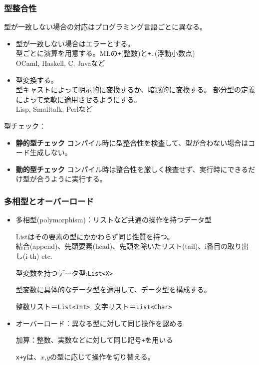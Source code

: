 \documentclass[dvipdfmx]{beamer}
\begin{document}
\begin{frame}
  \frametitle{型整合性}
  型が一致しない場合の対応はプログラミング言語ごとに異なる。

  \begin{itemize}
    \item 型が一致しない場合はエラーとする。\\
          型ごとに演算を用意する。MLの\texttt{+}(整数)と\texttt{+.}(浮動小数点)\\
          OCaml, Haskell, C, Javaなど
    \item 型変換する。\\
          型キャストによって明示的に変換するか、暗黙的に変換する。
          部分型の定義によって柔軟に適用させるようにする。\\
          Lisp, Smalltalk, Perlなど
  \end{itemize}

  型チェック：
  \begin{itemize}
    \item {\bf 静的型チェック}\quad
          コンパイル時に型整合性を検査して、型が合わない場合はコード生成しない。
    \item {\bf 動的型チェック}\quad
          コンパイル時は整合性を厳しく検査せず、実行時にできるだけ型が合うように実行する。
  \end{itemize}

\end{frame}

\begin{frame}[fragile]
  \frametitle{多相型とオーバーロード}

  \begin{itemize}
    \item 多相型(polymorphism)：リストなど共通の操作を持つデータ型

          Listはその要素の型にかかわらず同じ性質を持つ。\\
          結合(append)、先頭要素(head)、先頭を除いたリスト(tail)、i番目の取り出し(i-th) etc.

          \vspace*{10pt}

          型変数を持つデータ型:\verb|List<X>|

          型変数に具体的なデータ型を適用して、データ型を構成する。

          整数リスト＝\verb|List<Int>|, 文字リスト＝\verb|List<Char>|

    \item オーバーロード：異なる型に対して同じ操作を認める

          加算：整数、実数などに対して同じ記号\texttt{+}を用いる

          \texttt{x+y}は、$x$,$y$の型に応じて操作を切り替える。
  \end{itemize}
\end{frame}
\end{document}
